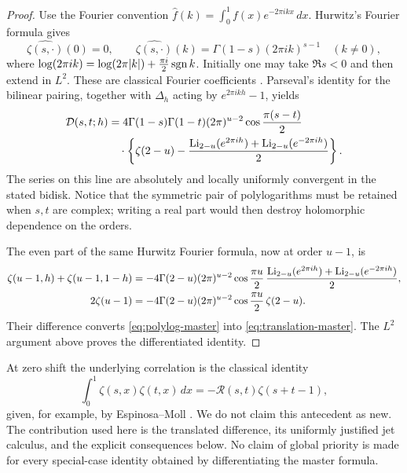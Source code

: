 \begin{proof}
Use the Fourier convention $\widehat f(k)=\int_0^1 f(x)e^{-2\pi ikx}\,dx$.
Hurwitz's Fourier formula gives
\begin{equation}\label{eq:fourier-hurwitz}
 \widehat{\zeta(s,\cdot)}(0)=0,
 \qquad
 \widehat{\zeta(s,\cdot)}(k)=\Gamma(1-s)(2\pi ik)^{s-1}
 \quad(k\ne0),
\end{equation}
where $\log(2\pi ik)=\log(2\pi|k|)+\tfrac{\pi i}2\operatorname{sgn} k$.
Initially one may take $\Re s<0$ and then extend in $L^2$.
These are classical Fourier coefficients \cite{DLMFHurwitz,EM1}.
Parseval's identity for the bilinear pairing, together with
$\Delta_h$ acting by $e^{2\pi ikh}-1$, yields
\begin{align}
 \mathcal D(s,t;h)
 &=4\Gamma(1-s)\Gamma(1-t)(2\pi)^{u-2}
       \cos\frac{\pi(s-t)}2\notag\\
 &\quad\cdot\left\{\zeta(2-u)
       -\frac{\operatorname{Li}_{2-u}(e^{2\pi ih})+
                    \operatorname{Li}_{2-u}(e^{-2\pi ih})}{2}\right\}.
 \label{eq:polylog-master}
\end{align}
The series on this line are absolutely and locally uniformly convergent
in the stated bidisk. Notice that the symmetric pair of polylogarithms
must be retained when $s,t$ are complex; writing a real part would then
destroy holomorphic dependence on the orders.

The even part of the same Hurwitz Fourier formula, now at order $u-1$,
is
\begin{align*}
 \zeta(u-1,h)+\zeta(u-1,1-h)
 &=-4\Gamma(2-u)(2\pi)^{u-2}\cos\frac{\pi u}{2}\,
      \frac{\operatorname{Li}_{2-u}(e^{2\pi ih})+\operatorname{Li}_{2-u}(e^{-2\pi ih})}{2},\\
 2\zeta(u-1)&=-4\Gamma(2-u)(2\pi)^{u-2}
                   \cos\frac{\pi u}{2}\,\zeta(2-u).
\end{align*}
Their difference converts \eqref{eq:polylog-master} into
\eqref{eq:translation-master}. The $L^2$ argument above proves the
differentiated identity.
\end{proof}

\begin{remark}
At zero shift the underlying correlation is the classical identity
\[
 \int_0^1\zeta(s,x)\zeta(t,x)\,dx
 =-\mathcal R(s,t)\zeta(s+t-1),
\]
given, for example, by Espinosa--Moll \cite[Theorem 3.1]{EM1}.
We do not claim this antecedent as new. The contribution used here is
the translated difference, its uniformly justified jet calculus, and the
explicit consequences below. No claim of global priority is made for
every special-case identity obtained by differentiating the master formula.
\end{remark}

